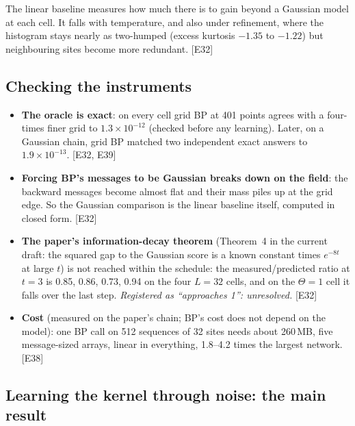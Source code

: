 \documentclass[11pt,a4paper]{article}
\newcommand{\src}[1]{{\footnotesize\color{gray}[#1]}}
\newcommand{\fals}[1]{{\small\itshape #1}}
\begin{document}
The linear baseline measures how much there is to gain beyond a Gaussian model at each cell. It falls with temperature, and also
under refinement, where the histogram stays nearly as two-humped (excess kurtosis $-1.35$ to $-1.22$) but neighbouring sites
become more redundant. \src{E32}

\subsection{Checking the instruments}

\begin{itemize}
\item \textbf{The oracle is exact}: on every cell grid BP at 401 points agrees with a four-times finer grid to $1.3\times10^{-12}$
(checked before any learning). Later, on a Gaussian chain, grid BP matched two independent exact answers to $1.9\times10^{-13}$.
\src{E32, E39}
\item \textbf{Forcing BP's messages to be Gaussian breaks down on the field}: the backward messages become almost flat and their mass
piles up at the grid edge. So the Gaussian comparison is the linear baseline itself, computed in closed form. \src{E32}
\item \textbf{The paper's information-decay theorem} (Theorem~4 in the current draft: the squared gap to the Gaussian score is a known
constant times $e^{-8t}$ at large $t$) is not reached within the schedule: the measured/predicted ratio at $t=3$ is 0.85, 0.86, 0.73,
0.94 on the four $L=32$ cells, and on the $\Theta=1$ cell it falls over the last step. \fals{Registered as ``approaches 1'': unresolved.}
\src{E32}
\item \textbf{Cost} (measured on the paper's chain; BP's cost does not depend on the model): one BP call on 512 sequences of 32 sites
needs about 260\,MB, five message-sized arrays, linear in everything, 1.8--4.2 times the largest network. \src{E38}
\end{itemize}

\subsection{Learning the kernel through noise: the main result}
\end{document}
